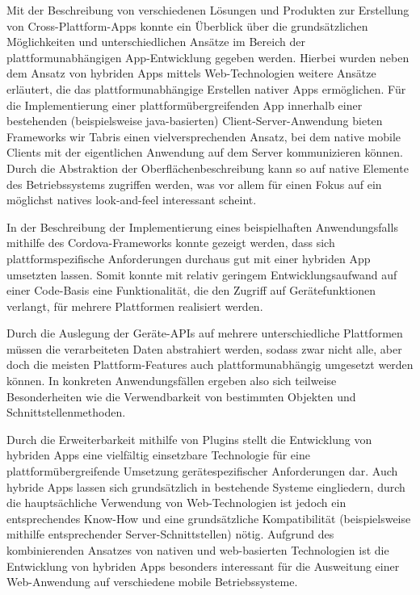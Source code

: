 
	\label{sec:schluss}



Mit der Beschreibung von verschiedenen Lösungen und Produkten zur Erstellung von Cross-Plattform-Apps konnte ein Überblick über die grundsätzlichen Möglichkeiten und unterschiedlichen Ansätze im Bereich der plattformunabhängigen App-Entwicklung gegeben werden.
Hierbei wurden neben dem Ansatz von hybriden Apps mittels Web-Technologien weitere Ansätze erläutert, die das plattformunabhängige Erstellen nativer Apps ermöglichen. 
Für die Implementierung einer plattformübergreifenden App innerhalb einer bestehenden (beispielsweise \gls{java}-basierten) Client-Server-Anwendung bieten Frameworks wir Tabris einen vielversprechenden Ansatz, bei dem native mobile Clients mit der eigentlichen Anwendung auf dem Server kommunizieren können.
Durch die Abstraktion der Oberflächenbeschreibung kann so auf native Elemente des Betriebssystems zugriffen werden, was vor allem für einen Fokus auf ein möglichst natives \gls{look-and-feel} interessant scheint.

In der Beschreibung der Implementierung eines beispielhaften Anwendungsfalls mithilfe des Cordova-Frameworks konnte gezeigt werden, dass sich plattformspezifische Anforderungen durchaus gut mit einer hybriden App umsetzten lassen.
Somit konnte mit relativ geringem Entwicklungsaufwand auf einer Code-Basis eine Funktionalität, die den Zugriff auf Gerätefunktionen verlangt, für mehrere Plattformen realisiert werden.

Durch die Auslegung der Geräte-APIs auf mehrere unterschiedliche Plattformen müssen die verarbeiteten Daten abstrahiert werden, sodass zwar nicht alle, aber doch die meisten Plattform-Features auch plattformunabhängig umgesetzt werden können.
In konkreten Anwendungsfällen ergeben also sich teilweise Besonderheiten wie die Verwendbarkeit von bestimmten Objekten und Schnittstellenmethoden.

Durch die Erweiterbarkeit mithilfe von Plugins stellt die Entwicklung von hybriden Apps eine vielfältig einsetzbare Technologie für eine plattformübergreifende  Umsetzung gerätespezifischer Anforderungen dar.
Auch hybride Apps lassen sich grundsätzlich in bestehende Systeme eingliedern, durch die hauptsächliche Verwendung von Web-Technologien ist jedoch ein entsprechendes Know-How und eine grundsätzliche Kompatibilität (beispielsweise mithilfe entsprechender Server-Schnittstellen) nötig.
Aufgrund des kombinierenden Ansatzes von nativen und web-basierten Technologien ist die Entwicklung von hybriden Apps besonders interessant für die Ausweitung einer Web-Anwendung auf verschiedene mobile Betriebssysteme.

